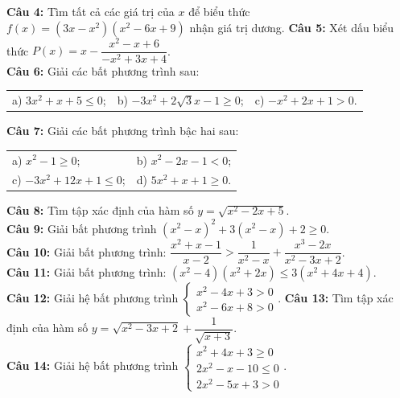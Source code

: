 \documentclass[12pt,a4paper]{extarticle}
\begin{document}
\vspace{0.5cm}
\noindent\textbf{Câu 4:} Tìm tất cả các giá trị của $x$ để biểu thức $f(x) = (3x - x^2)(x^2 - 6x + 9)$ nhận giá trị dương.
\vspace{0.2cm}
\noindent\textbf{Câu 5:} Xét dấu biểu thức $P(x) = x - \dfrac{x^2 - x + 6}{-x^2 + 3x + 4}$.\\
\vspace{0.2cm}
\noindent\textbf{Câu 6:} Giải các bất phương trình sau:
\begin{center}
\begin{tabular}{p{5cm} p{5cm} p{5cm}}
a) $3x^2 + x + 5 \le 0$; & b) $-3x^2 + 2\sqrt{3}x - 1 \ge 0$; & c) $-x^2 + 2x + 1 > 0$.
\end{tabular}
\end{center}
\noindent\textbf{Câu 7:} Giải các bất phương trình bậc hai sau:
\begin{center}
\begin{tabular}{p{7.5cm} p{7.5cm}}
a) $x^2 - 1 \ge 0$; & b) $x^2 - 2x - 1 < 0$; \\
c) $-3x^2 + 12x + 1 \le 0$; & d) $5x^2 + x + 1 \ge 0$.
\end{tabular}
\end{center}
\noindent\textbf{Câu 8:} Tìm tập xác định của hàm số $y = \sqrt{x^2 - 2x + 5}$.\\
\vspace{0.2cm}
\noindent\textbf{Câu 9:} Giải bất phương trình $(x^2 - x)^2 + 3(x^2 - x) + 2 \ge 0$.\\
\vspace{0.2cm}
\noindent\textbf{Câu 10:} Giải bất phương trình: $\dfrac{x^2 + x - 1}{x - 2} > \dfrac{1}{x^2 - x} + \dfrac{x^3 - 2x}{x^2 - 3x + 2}$.\\
\vspace{0.2cm}
\noindent\textbf{Câu 11:} Giải bất phương trình: $(x^2 - 4)(x^2 + 2x) \le 3(x^2 + 4x + 4)$.\\
\vspace{0.2cm}
\noindent\textbf{Câu 12:} Giải hệ bất phương trình $\begin{cases} x^2 - 4x + 3 > 0 \\ x^2 - 6x + 8 > 0 \end{cases}$.
\vspace{0.2cm}
\noindent\textbf{Câu 13:} Tìm tập xác định của hàm số $y = \sqrt{x^2 - 3x + 2} + \dfrac{1}{\sqrt{x + 3}}$.\\
\vspace{0.2cm}
\noindent\textbf{Câu 14:} Giải hệ bất phương trình $\begin{cases} x^2 + 4x + 3 \ge 0 \\ 2x^2 - x - 10 \le 0 \\ 2x^2 - 5x + 3 > 0 \end{cases}$.\\
\end{document}
